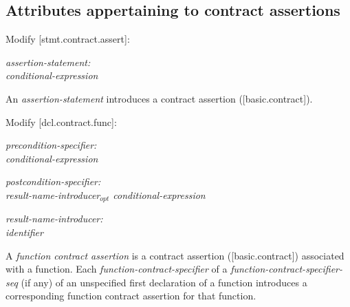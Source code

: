 {\subsection{Attributes appertaining to contract assertions}

Modify [stmt.contract.assert]:

\begin{adjustwidth}{0.5cm}{0.5cm}
\emph{assertion-statement:} \\
\phantom{~~~}  \tcode{(} \emph{conditional-expression} \tcode{) ;}
 
An \emph{assertion-statement} introduces a contract assertion ([basic.contract]).  
\end{adjustwidth}

Modify [dcl.contract.func]:

\begin{adjustwidth}{0.5cm}{0.5cm}
\emph{precondition-specifier:} \\
\phantom{~~~}  \tcode{(} \emph{conditional-expression} \tcode{)}

\emph{postcondition-specifier:} \\
\phantom{~~~}  \tcode{(} \emph{result-name-introducer$_{opt}$ conditional-expression} \tcode{)}

\emph{result-name-introducer:} \\
\phantom{~~~}\emph{identifier} \tcode{:}

A \emph{function contract assertion} is a contract assertion ([basic.contract]) associated with a function. Each \emph{function-contract-specifier} of a \emph{function-contract-specifier-seq} (if any) of an unspecified first declaration of a function introduces a corresponding function contract assertion for that function.  
\end{adjustwidth}

}

